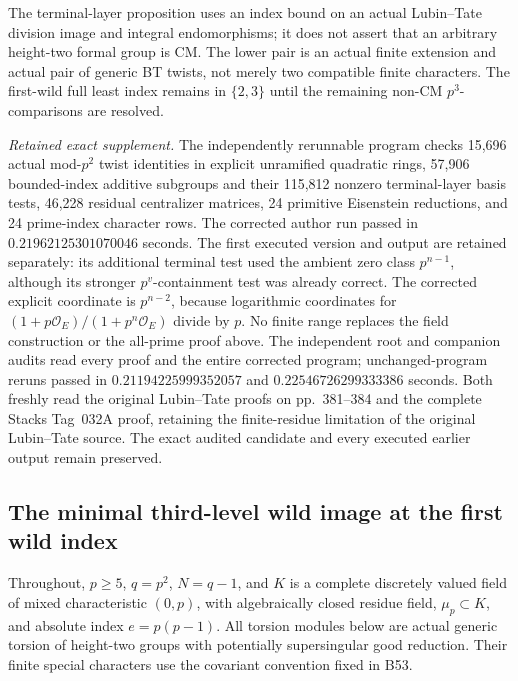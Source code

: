 \begin{remark}
\label{rem:B-RD78-scope}
The terminal-layer proposition uses an index bound on an actual
Lubin--Tate division image and integral endomorphisms; it does
not assert that an arbitrary height-two formal group is CM.
The lower pair is an actual finite extension and actual pair
of generic BT twists, not merely two compatible finite characters.
The first-wild full least index remains in \(\{2,3\}\) until
the remaining non-CM \(p^3\)-comparisons are resolved.


\smallskip
\noindent\emph{Retained exact supplement.}
The independently rerunnable program
checks 15,696 actual mod-\(p^2\) twist identities in explicit
unramified quadratic rings, 57,906 bounded-index additive
subgroups and their 115,812 nonzero terminal-layer basis tests,
46,228 residual centralizer matrices, 24 primitive Eisenstein
reductions, and 24 prime-index character rows.
The corrected author run passed in
\(0.21962125301070046\) seconds.
The first executed version and output are retained separately:
its additional terminal test used the ambient zero class
\(p^{n-1}\), although its stronger \(p^v\)-containment test
was already correct. The corrected explicit coordinate is
\(p^{n-2}\), because logarithmic coordinates for
\((1+p\mathcal O_E)/(1+p^n\mathcal O_E)\) divide by \(p\).
No finite range replaces the field construction or the
all-prime proof above.
The independent root and companion audits read every proof and
the entire corrected program; unchanged-program reruns passed in
\(0.21194225999352057\) and \(0.22546726299333386\) seconds.
Both freshly read the original Lubin--Tate proofs on
pp.~381--384 and the complete Stacks Tag~032A proof, retaining
the finite-residue limitation of the original Lubin--Tate source.
The exact audited candidate and every executed earlier output
remain preserved.
\end{remark}


\subsection{The minimal third-level wild image at the first wild index}

Throughout, \(p\ge5\), \(q=p^2\), \(N=q-1\), and \(K\) is a
complete discretely valued field of mixed characteristic \((0,p)\),
with algebraically closed residue field, \(\mu_p\subset K\), and
absolute index \(e=p(p-1)\). All torsion modules below are actual
generic torsion of height-two groups with potentially supersingular
good reduction. Their finite special characters use the covariant
convention fixed in B53.

